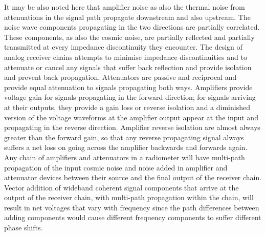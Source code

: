    It may be also noted here that amplifier noise as also the thermal noise from attenuations in the signal path propagate downstream and also upstream.  The noise wave components propagating in the two directions are partially correlated.  These components, as also the cosmic noise, are partially reflected and partially transmitted at every impedance discontinuity they encounter.  The design of analog receiver chains attempts to minimise impedance discontinuities and to attenuate or cancel any signals that suffer back reflection and provide isolation and prevent back propagation. Attenuators are passive and reciprocal and provide equal attenuation to signals propagating both ways.  Amplifiers provide voltage gain for signals propagating in the forward direction; for signals arriving at their outputs, they provide a gain loss or reverse isolation and a diminished version of the voltage waveforms at the amplifier output appear at the input and propagating in the reverse direction.  Amplifier reverse isolation are almost always greater than the forward gain, so that any reverse propagating signal always suffers a net loss on going across the amplifier backwards and forwards again.  Any chain of amplifiers and attenuators in a radiometer will have multi-path propagation of the input cosmic noise and noise added in amplifier and attenuator devices between their source and the final output of the receiver chain.  Vector addition of wideband coherent signal components that arrive at the output of the receiver chain, with multi-path propagation within the chain, will result in net voltages that vary with frequency since the path differences between adding components would cause different frequency components to suffer different phase shifts.
   
